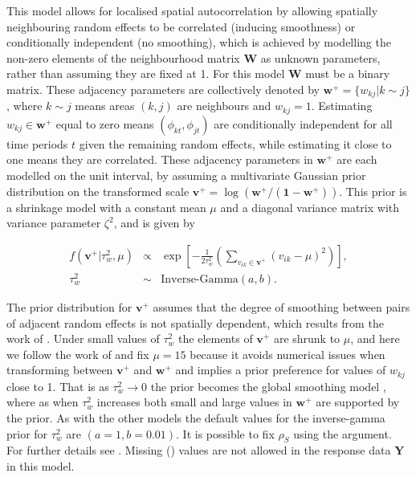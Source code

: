 \documentclass[article, nojss]{jss}
\begin{document}
\hspace{1cm} This model allows for localised spatial autocorrelation by allowing spatially neighbouring  random effects to be correlated (inducing smoothness) or conditionally independent (no smoothing), which is  achieved by modelling the non-zero elements of the neighbourhood matrix $\mathbf{W}$  as unknown parameters, rather than assuming they are fixed at 1. For this model $\mathbf{W}$ must be a binary matrix. These adjacency parameters are collectively denoted by $\mathbf{w}^{+}=\{w_{kj}|k\sim j\}$, where $k\sim j$ means areas $(k,j)$ are neighbours and $w_{kj}=1$. Estimating $w_{kj}\in\mathbf{w}^{+}$ equal to zero means $(\phi_{kt}, \phi_{jt})$  are conditionally independent for all time periods $t$  given the remaining random effects, while estimating it close to one means they are correlated. These adjacency parameters in $\mathbf{w}^{+}$ are each modelled on the unit interval, by assuming a multivariate Gaussian prior distribution on the transformed scale $\mathbf{v}^+ = \log\left(\mathbf{w}^{+}/(\mathbf{1} - \mathbf{w}^{+}) \right)$.  This prior is a shrinkage model with a constant mean $\mu$ and a diagonal variance matrix with variance parameter $\zeta^2$, and is given by


\begin{eqnarray}
f(\mathbf{v}^{+}|\tau^2_w, \mu) & \propto & \exp\left[-\frac{1}{2\tau^2_w}\left(\sum_{v_{ik}\in\mathbf{v}^{+}}(v_{ik} - \mu)^2\right)\right], \label{caradaptive2}\\
\tau^{2}_w&\sim&\mbox{Inverse-Gamma}(a, b).\nonumber
\end{eqnarray}

The prior distribution for $\mathbf{v}^+$ assumes that the degree of smoothing between pairs of adjacent random effects is not spatially dependent, which results from the  work of \cite{rushworth2016}. Under small values of $\tau_w^2$ the elements of  $\mathbf{v}^+$ are shrunk to $\mu$, and here we follow the work of \cite{rushworth2016} and fix $\mu=15$ because it avoids numerical issues when transforming between $\mathbf{v}^+$ and $\mathbf{w}^+$ and implies a prior preference for values of $w_{kj}$ close to 1.  That is as $\tau^2_w \rightarrow 0$ the prior becomes the global smoothing model , where as when $\tau^{2}_{w}$ increases both small and large values in $\mathbf{w}^{+}$ are supported by the prior. As with the other models the default values for the inverse-gamma prior for $\tau_w^2$ are $(a=1, b=0.01)$. It is possible to fix $\rho_S$ using the  argument. For further details see \cite{rushworth2016}. Missing () values are not allowed in the response data $\mathbf{Y}$ in this model.\\
\end{document}
